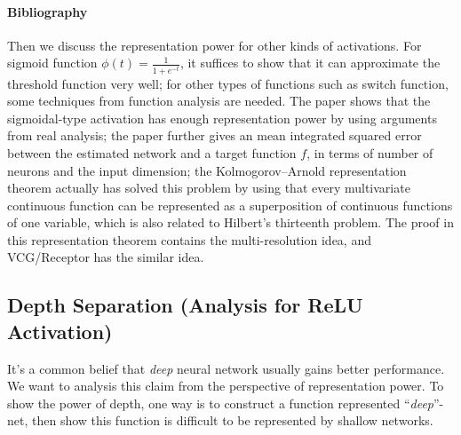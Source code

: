 \paragraph{Bibliography}
Then we discuss the representation power for other kinds of activations.
For sigmoid function $\phi(t) = \frac{1}{1+e^{-t}}$, it suffices to show that it can approximate the threshold function very well;
for other types of functions such as switch function, 
some techniques from function analysis are needed.
The paper \citep{3561150} shows that the 
sigmoidal-type activation has enough representation power by using arguments from real analysis;
the paper \citep{Barron1994} further gives an 
mean integrated squared error between the estimated network and a target function $f$, in terms of number of neurons and the input dimension;
the Kolmogorov–Arnold representation theorem actually has solved this problem by using that every multivariate continuous function can be represented as a superposition of continuous functions of one variable, which is also related to Hilbert's thirteenth problem.
The proof in this representation theorem contains the multi-resolution idea, and VCG/Receptor has the similar idea.

\subsection{Depth Separation (Analysis for ReLU Activation)}
It's a common belief that \emph{deep} neural network usually gains better performance. 
We want to analysis this claim from the perspective of representation power.
To show the power of depth, one way is to construct a function represented ``\emph{deep}''-net, then show this function is difficult to be represented by shallow networks.

